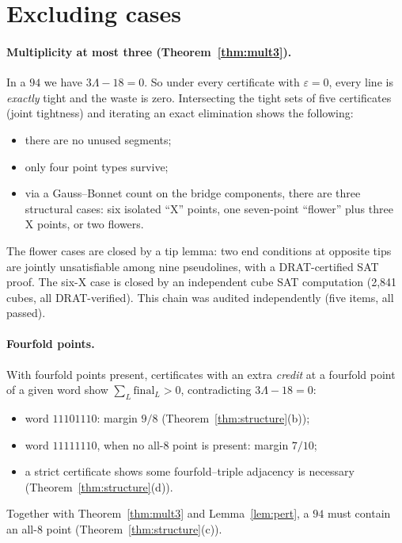\documentclass[11pt]{article}
\theoremstyle{definition}
\theoremstyle{remark}
\newcommand{\Lam}{\Lambda}
\begin{document}
\section{Excluding cases}\label{sec:excl}

\paragraph{Multiplicity at most three (Theorem~\ref{thm:mult3}).} In a $94$ we have $3\Lam-18=0$. So under every
certificate with $\varepsilon=0$, every line is \emph{exactly} tight and the waste is zero. Intersecting the tight
sets of five certificates (joint tightness) and iterating an exact elimination shows the following:
\begin{itemize}[nosep]
\item there are no unused segments;
\item only four point types survive;
\item via a Gauss--Bonnet count on the bridge components, there are three structural cases: six isolated ``X'' points,
one seven-point ``flower'' plus three X points, or two flowers.
\end{itemize}
The flower cases are closed by a tip lemma: two end conditions at opposite tips are jointly unsatisfiable among nine
pseudolines, with a DRAT-certified SAT proof. The six-X case is closed by an independent cube SAT computation
(2,841 cubes, all DRAT-verified). This chain was audited independently (five items, all passed).

\paragraph{Fourfold points.} With fourfold points present, certificates with an extra \emph{credit} at a fourfold point
of a given word show $\sum_L\mathrm{final}_L>0$, contradicting $3\Lam-18=0$:
\begin{itemize}[nosep]
\item word $11101110$: margin $9/8$ (Theorem~\ref{thm:structure}(b));
\item word $11111110$, when no all-8 point is present: margin $7/10$;
\item a strict certificate shows some fourfold--triple adjacency is necessary (Theorem~\ref{thm:structure}(d)).
\end{itemize}
Together with Theorem~\ref{thm:mult3} and Lemma~\ref{lem:pert}, a $94$ must contain an all-8 point
(Theorem~\ref{thm:structure}(c)).
\end{document}
